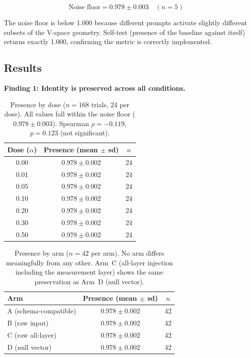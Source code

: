 \documentclass[11pt,a4paper]{article}
\begin{document}
\begin{equation*}
\text{Noise floor} = 0.978 \pm 0.003 \quad (n = 5)
\end{equation*}

The noise floor is below 1.000 because different prompts activate slightly
different subsets of the V-space geometry. Self-test (presence of the baseline
against itself) returns exactly 1.000, confirming the metric is correctly
implemented.

\subsection{Results}
\label{sec:results}

\textbf{Finding 1: Identity is preserved across all conditions.}

\begin{table}[H]
\centering
\caption{Presence by dose ($n = 168$ trials, 24 per dose). All values fall
within the noise floor ($0.978 \pm 0.003$). Spearman $\rho{=}{-}0.119$,
$p{=}0.123$ (not significant).}
\label{tab:presence_dose}
\begin{tabular}{ccc}
\toprule
Dose ($\alpha$) & Presence (mean $\pm$ sd) & $n$ \\
\midrule
0.00 & $0.978 \pm 0.002$ & 24 \\
0.01 & $0.978 \pm 0.002$ & 24 \\
0.05 & $0.978 \pm 0.002$ & 24 \\
0.10 & $0.978 \pm 0.002$ & 24 \\
0.20 & $0.978 \pm 0.002$ & 24 \\
0.30 & $0.978 \pm 0.002$ & 24 \\
0.50 & $0.978 \pm 0.002$ & 24 \\
\bottomrule
\end{tabular}
\end{table}

\begin{table}[H]
\centering
\caption{Presence by arm ($n = 42$ per arm). No arm differs meaningfully
from any other. Arm~C (all-layer injection including the measurement layer)
shows the same preservation as Arm~D (null vector).}
\label{tab:presence_arm}
\begin{tabular}{lcc}
\toprule
Arm & Presence (mean $\pm$ sd) & $n$ \\
\midrule
A (schema-compatible) & $0.978 \pm 0.002$ & 42 \\
B (raw input) & $0.978 \pm 0.002$ & 42 \\
C (raw all-layer) & $0.978 \pm 0.002$ & 42 \\
D (null vector) & $0.978 \pm 0.002$ & 42 \\
\bottomrule
\end{tabular}
\end{table}
\end{document}
